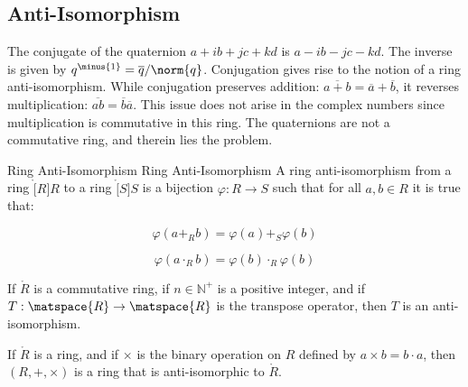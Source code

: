 \documentclass{book}                                                           %
\begin{document}
        \subsection{Anti-Isomorphism}
            The conjugate of the quaternion $a+ib+jc+kd$ is $a-ib-jc-kd$.
            The inverse is given by $q^{\minus{1}}=\overline{q}/\norm{q}$.
            Conjugation gives rise to the notion of a ring anti-isomorphism.
            While conjugation preserves addition:
            $\overline{a+b}=\overline{a}+\overline{b}$, it reverses
            multiplication: $\overline{ab}=\overline{b}\overline{a}$. This
            issue does not arise in the complex numbers since multiplication
            is commutative in this ring. The quaternions are not a
            commutative ring, and therein lies the problem.
            \begin{fdefinition}{Ring Anti-Isomorphism}
                               {Ring Anti-Isomorphism}
                A ring anti-isomorphism from a ring $\ring[R]{R}$ to a ring
                $\ring[S]{S}$ is a bijection $\varphi:R\rightarrow{S}$ such
                that for all $a,b\in{R}$ it is true that:
                \par
                \begin{minipage}[b]{0.49\textwidth}
                    \centering
                    \begin{equation*}
                        \varphi(a+_{R}b)=\varphi(a)+_{S}\varphi(b)
                    \end{equation*}
                \end{minipage}
                \hfill
                \begin{minipage}[b]{0.49\textwidth}
                    \centering
                    \begin{equation*}
                        \varphi(a\cdot_{R}b)=\varphi(b)\cdot_{R}\varphi(b)
                    \end{equation*}
                \end{minipage}
            \end{fdefinition}
            \begin{theorem}
                If $\ring{R}$ is a commutative ring, if $n\in\mathbb{N}^{+}$
                is a positive integer, and if
                $T:\matspace{R}\rightarrow\matspace{R}$ is the transpose
                operator, then $T$ is an anti-isomorphism.
            \end{theorem}
            \begin{theorem}
                If $\ring{R}$ is a ring, and if $\times$ is the binary
                operation on $R$ defined by $a\times{b}=b\cdot{a}$, then
                $(R,+,\times)$ is a ring that is anti-isomorphic to
                $\ring{R}$.
            \end{theorem}
\end{document}
